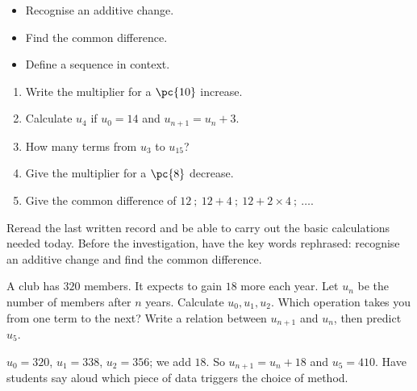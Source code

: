     \begin{objectives}\begin{itemize}\item Recognise an additive change.\item Find the common difference.\item Define a sequence in context.\end{itemize}\end{objectives}
    \begin{fluency}\begin{enumerate}\item Write the multiplier for a $\pc{10}$ increase. \item Calculate $u_4$ if $u_0=14$ and $u_{n+1}=u_n+3$. \item How many terms from $u_3$ to $u_{15}$? \item Give the multiplier for a $\pc{8}$ decrease. \item Give the common difference of $12\ ;\ 12+4\ ;\ 12+2\times4\ ;\ \ldots$. \end{enumerate}\end{fluency}
    \begin{prerequisites}Reread the last written record and be able to carry out the basic calculations needed today. Before the investigation, have the key words rephrased: recognise an additive change and find the common difference.\end{prerequisites}

    \begin{activity}
    A club has $320$ members. It expects to gain $18$ more each year. Let $u_n$ be the number of members after $n$ years. Calculate $u_0,u_1,u_2$. Which operation takes you from one term to the next? Write a relation between $u_{n+1}$ and $u_n$, then predict $u_5$.
    \begin{center}\end{center}
    \end{activity}
    \begin{solution}$u_0=320$, $u_1=338$, $u_2=356$; we add $18$. So $u_{n+1}=u_n+18$ and $u_5=410$. Have students say aloud which piece of data triggers the choice of method.\end{solution}

